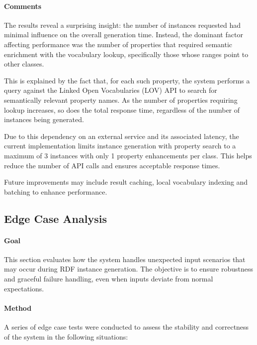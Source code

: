 \paragraph{Comments}
The results reveal a surprising insight: the number of instances requested had minimal influence on the overall generation time. Instead, the dominant factor affecting performance was the number of properties that required semantic enrichment with the vocabulary lookup, specifically those whose ranges point to other classes.

This is explained by the fact that, for each such property, the system performs a query against the Linked Open Vocabularies (LOV) API to search for semantically relevant property names. As the number of properties requiring lookup increases, so does the total response time, regardless of the number of instances being generated.

Due to this dependency on an external service and its associated latency, the current implementation limits instance generation with property search to a maximum of 3 instances with only 1 property enhancements per class. This helps reduce the number of API calls and ensures acceptable response times. 

Future improvements may include result caching, local vocabulary indexing and batching to enhance performance. 

\subsection{Edge Case Analysis}

\paragraph{Goal}
This section evaluates how the system handles unexpected input scenarios that may occur during RDF instance generation. The objective is to ensure robustness and graceful failure handling, even when inputs deviate from normal expectations.

\paragraph{Method}
A series of edge case tests were conducted to assess the stability and correctness of the system in the following situations:

